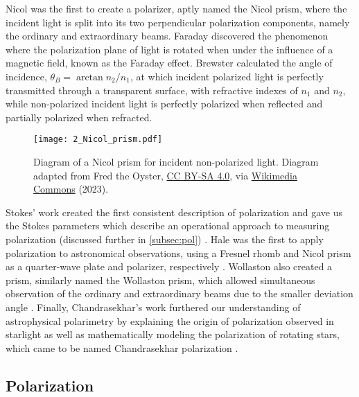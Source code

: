 Nicol was the first to create a polarizer, aptly named the Nicol prism, where the incident light is split into its two perpendicular polarization components, namely the ordinary and extraordinary beams. Faraday discovered the phenomenon where the polarization plane of light is rotated when under the influence of a magnetic field, known as the Faraday effect. Brewster calculated the angle of incidence, $\theta_{B} = \arctan{n_{2} / n_{1}}$, at which incident polarized light is perfectly transmitted through a transparent surface, with refractive indexes of $n_{1}$ and $n_{2}$, while non-polarized incident light is perfectly polarized when reflected and partially polarized when refracted.

\begin{figure}[t]
    \centering
    \texttt{[image: 2\_Nicol\_prism.pdf]}
    \caption{Diagram of a Nicol prism for incident non-polarized light. Diagram adapted from Fred the Oyster, \protect\href{https://creativecommons.org/licenses/by-sa/4.0/}{CC BY-SA 4.0}, via \protect\href{https://en.m.wikipedia.org/wiki/File:Nicol_prism.svg}{Wikimedia Commons} (2023).}
    \label{fig:Nicol_prism}
\end{figure}

Stokes' work created the first consistent description of polarization and gave us the Stokes parameters which describe an operational approach to measuring polarization (discussed further in \autoref{subsec:pol}) \citep{Stokes}. Hale was the first to apply polarization to astronomical observations, using a Fresnel rhomb and Nicol prism as a quarter-wave plate and polarizer, respectively \citep{Hale_pre,Hale_post}. Wollaston also created a prism, similarly named the Wollaston prism, which allowed simultaneous observation of the ordinary and extraordinary beams due to the smaller deviation angle \citep{WollPrism}. Finally, Chandrasekhar's work furthered our understanding of astrophysical polarimetry by explaining the origin of polarization observed in starlight as well as mathematically modeling the polarization of rotating stars, which came to be named Chandrasekhar polarization \citep{chandrasekhar}.

\subsection{Polarization} \label{subsec:pol}

